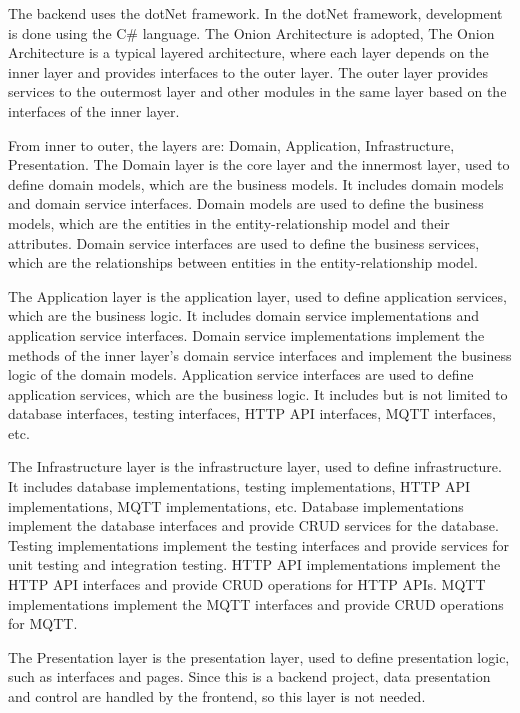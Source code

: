 The backend uses the dotNet framework.
In the dotNet framework, development is done using the C\# language. 
The Onion Architecture is adopted,
The Onion Architecture is a typical layered architecture, 
where each layer depends on the inner layer and provides interfaces to the outer layer.
The outer layer provides services to the outermost layer 
and other modules in the same layer based on the interfaces of the inner layer.

From inner to outer, the layers are: Domain, Application, Infrastructure, Presentation.
The Domain layer is the core layer and the innermost layer, used to define domain models, 
which are the business models.
It includes domain models and domain service interfaces.
Domain models are used to define the business models, 
which are the entities in the entity-relationship model and their attributes.
Domain service interfaces are used to define the business services, 
which are the relationships between entities in the entity-relationship model.

The Application layer is the application layer, 
used to define application services, which are the business logic.
It includes domain service implementations and application service interfaces.
Domain service implementations implement the methods of the inner layer's domain service 
interfaces and implement the business logic of the domain models.
Application service interfaces are used to define application services, 
which are the business logic.
It includes but is not limited to database interfaces, testing interfaces, 
HTTP API interfaces, MQTT interfaces, etc.

The Infrastructure layer is the infrastructure layer, used to define infrastructure.
It includes database implementations, testing implementations, 
HTTP API implementations, MQTT implementations, etc.
Database implementations implement the database interfaces 
and provide CRUD services for the database.
Testing implementations implement the testing interfaces 
and provide services for unit testing and integration testing.
HTTP API implementations implement the HTTP API interfaces 
and provide CRUD operations for HTTP APIs.
MQTT implementations implement the MQTT interfaces 
and provide CRUD operations for MQTT.

The Presentation layer is the presentation layer, used to define presentation logic, 
such as interfaces and pages. Since this is a backend project,
data presentation and control are handled by the frontend, 
so this layer is not needed.


